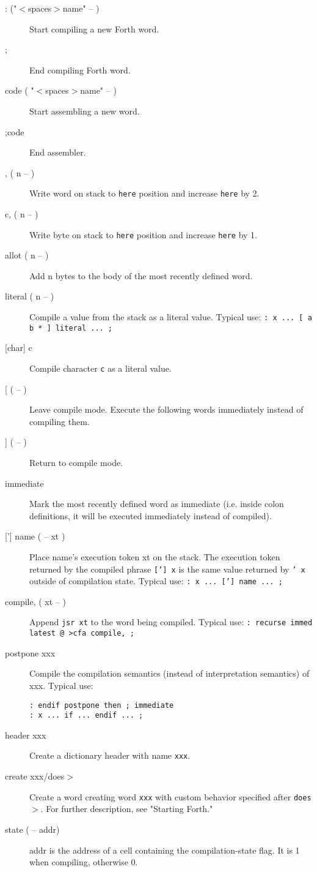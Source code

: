 \begin{description}
\item[: ("$<$spaces$>$name" -- )] Start compiling a new Forth word.
\item[;] End compiling Forth word.
\item[code ( "$<$spaces$>$name" -- )] Start assembling a new word.
\item[;code] End assembler.
\item[, ( n -- )] Write word on stack to \texttt{here} position and increase \texttt{here} by 2.
\item[c, ( n -- )] Write byte on stack to \texttt{here} position and increase \texttt{here} by 1.
\item[allot ( n -- )] Add n bytes to the body of the most recently defined word.
\item[literal ( n -- )] Compile a value from the stack as a literal value. Typical use: \texttt{: x ... [ a b * ] literal ... ;}
\item[[char{]} c] Compile character \texttt{c} as a literal value.
\item[[ ( -- )] Leave compile mode. Execute the following words immediately instead of compiling them.
\item[{]} ( -- )] Return to compile mode.
\item[immediate] Mark the most recently defined word as immediate (i.e. inside colon definitions, it will be executed immediately instead of compiled).
\item[{[']} name ( -- xt )] Place name's execution token xt on the stack. The execution token returned by the compiled phrase \texttt{['] x} is the same value returned by \texttt{' x} outside of compilation state. Typical use: \texttt{: x ... {[}'{]} name ... ;}
\item[compile, ( xt -- )] Append \texttt{jsr xt} to the word being compiled. Typical use: \texttt{: recurse immed latest @ >cfa compile, ;}
\item[postpone xxx] Compile the compilation semantics (instead of interpretation semantics) of xxx. Typical use:
\begin{verbatim}
: endif postpone then ; immediate
: x ... if ... endif ... ;
\end{verbatim}
\item[header xxx] Create a dictionary header with name \texttt{xxx}.
\item[create xxx/does$>$] Create a word creating word \texttt{xxx} with custom behavior
specified after \texttt{does$>$}. For further description, see "Starting Forth."
\item[state ( -- addr)] addr is the address of a cell containing the compilation-state flag. It is 1 when compiling, otherwise 0.

\end{description}

